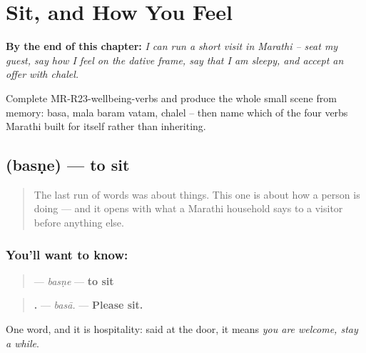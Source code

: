 
\chapter{Sit, and How You Feel}
\label{ch:mr-wellbeing-verbs}

\begin{chapteropening}
\textbf{By the end of this chapter:} \emph{I can run a short visit in Marathi -- seat my guest, say how I feel on the dative frame, say that I am sleepy, and accept an offer with chalel.}

Complete MR-R23-wellbeing-verbs and produce the whole small scene from memory: basa, mala baram vatam, chalel -- then name which of the four verbs Marathi built for itself rather than inheriting.
\end{chapteropening}

\section[\texorpdfstring{\mr{बसणे} (basṇe)}{बसणे (basṇe)}]{ (basṇe) — to sit}

\label{lesson:MR-C23-basne}



\begin{quote}
The last run of words was about things. This one is about how a person is doing — and it opens with what a Marathi household says to a visitor before anything else.
\end{quote}

\subsection*{You'll want to know: }
\begin{quote}
\textbf{} — \emph{basṇe} — \textbf{to sit}
\end{quote}

\begin{quote}
\textbf{.} — \emph{basā.} — \textbf{Please sit.}
\end{quote}

One word, and it is hospitality: said at the door, it means \emph{you are welcome, stay a while}.


